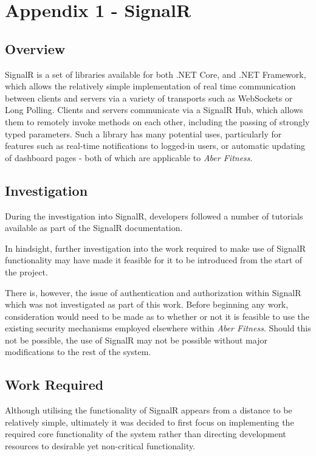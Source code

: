 \section{Appendix 1 - SignalR}

\subsection{Overview}

SignalR is a set of libraries available for both .NET Core, and .NET Framework, which allows the relatively simple implementation of real time communication between clients and servers via a variety of transports such as WebSockets or Long Polling\cite{SignalR}. Clients and servers communicate via a SignalR Hub, which allows them to remotely invoke methods on each other, including the passing of strongly typed parameters. Such a library has many potential uses, particularly for features such as real-time notifications to logged-in users, or automatic updating of dashboard pages - both of which are applicable to \textit{Aber Fitness}.

\subsection{Investigation}

During the investigation into SignalR, developers followed a number of tutorials available as part of the SignalR documentation.

In hindsight, further investigation into the work required to make use of SignalR functionality may have made it feasible for it to be introduced from the start of the project.

There is, however, the issue of authentication and authorization within SignalR which was not investigated as part of this work. Before beginning any work, consideration would need to be made as to whether or not it is feasible to use the existing security mechanisms employed elsewhere within \textit{Aber Fitness}. Should this not be possible, the use of SignalR may not be possible without major modifications to the rest of the system.

\subsection{Work Required}

Although utilising the functionality of SignalR appears from a distance to be relatively simple, ultimately it was decided to first focus on implementing the required core functionality of the system rather than directing development resources to desirable yet non-critical functionality.

